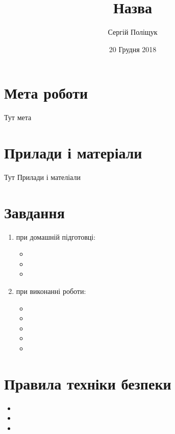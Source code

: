 \documentclass[twocolumn]{el-author}
\date{20 Грудня 2018}
\begin{document}
\title{Назва}

\author{Сергій Поліщук}


\maketitle

\section{Мета роботи}

Тут мета

\section{Прилади і матеріали}

Тут Прилади і мателіали

\section{Завдання}

\begin{enumerate}
	\item при домашній підготовці:
	\begin{itemize}
		\item  
		\item  
		\item  
	\end{itemize}
	\item при виконанні роботи:
	\begin{itemize}
		\item  
		\item  
		\item  
		\item  
		\item  
	\end{itemize}
	
\end{enumerate}

\section{Правила техніки безпеки}

\begin{itemize}
	\item  
	\item  
	\item  
\end{itemize}
\end{document}
